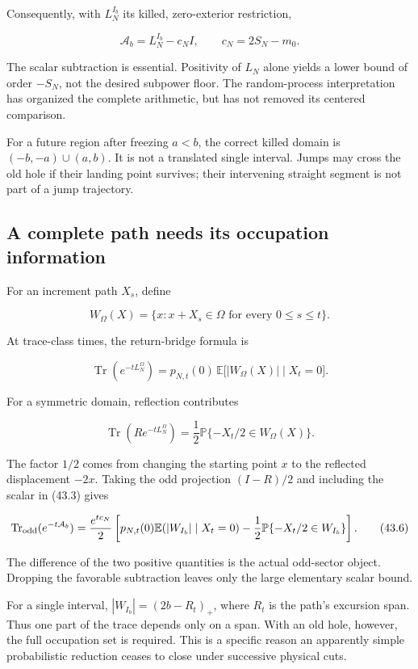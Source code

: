\documentclass[
  10pt,
  a4paper,
  10pt,
  oneside,
  openany]{book}
\begin{document}
Consequently, with \(L_N^{I_b}\) its killed, zero-exterior restriction,

\[
 \mathcal A_b=L_N^{I_b}-c_NI,
 \qquad c_N=2S_N-m_0.
 \tag{43.3}\label{eq:43.3}
\]

The scalar subtraction is essential. Positivity of \(L_N\) alone yields
a lower bound of order \(-S_N\), not the desired subpower floor. The
random-process interpretation has organized the complete arithmetic, but
has not removed its centered comparison.

For a future region after freezing \(a<b\), the correct killed domain is
\((-b,-a)\cup(a,b)\). It is not a translated single interval. Jumps may
cross the old hole if their landing point survives; their intervening
straight segment is not part of a jump trajectory.

\subsection{A complete path needs its occupation
information}\label{a-complete-path-needs-its-occupation-information}

For an increment path \(X_s\), define

\[
 W_\Omega(X)=\{x:x+X_s\in\Omega\text{ for every }0\le s\le t\}.
\]

At trace-class times, the return-bridge formula is

\[
 \operatorname{Tr}(e^{-tL_N^\Omega})
 =p_{N,t}(0)\,\mathbb E\bigl[|W_\Omega(X)|\mid X_t=0\bigr].
 \tag{43.4}\label{eq:43.4}
\]

For a symmetric domain, reflection contributes

\[
 \operatorname{Tr}(Re^{-tL_N^\Omega})
 =\frac12\mathbb P\{-X_t/2\in W_\Omega(X)\}.
 \tag{43.5}\label{eq:43.5}
\]

The factor \(1/2\) comes from changing the starting point \(x\) to the
reflected displacement \(-2x\). Taking the odd projection \((I-R)/2\)
and including the scalar in (43.3) gives

\[
 \operatorname{Tr}_{\rm odd}(e^{-t\mathcal A_b})
 =\frac{e^{tc_N}}2\left[
 p_{N,t}(0)\mathbb E(|W_{I_b}|\mid X_t=0)
 -\frac12\mathbb P\{-X_t/2\in W_{I_b}\}\right].
 \tag{43.6}\label{eq:43.6}
\]

The difference of the two positive quantities is the actual odd-sector
object. Dropping the favorable subtraction leaves only the large
elementary scalar bound.

For a single interval, \(|W_{I_b}|=(2b-R_t)_+\), where \(R_t\) is the
path's excursion span. Thus one part of the trace depends only on a
span. With an old hole, however, the full occupation set is required.
This is a specific reason an apparently simple probabilistic reduction
ceases to close under successive physical cuts.
\end{document}
